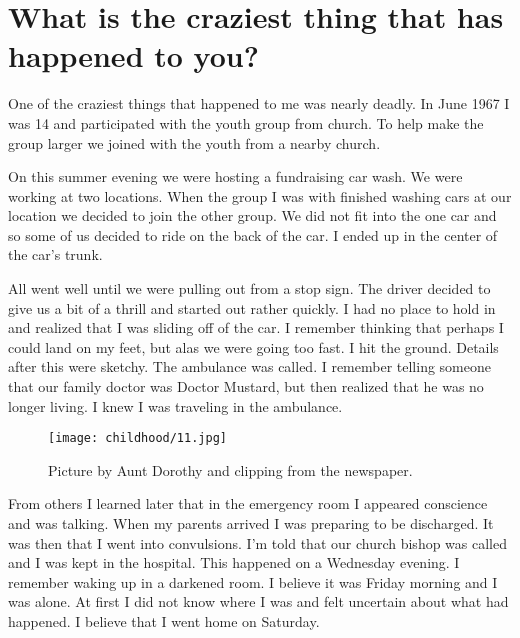 \section{What is the craziest thing that has happened to you?}
One of the craziest things that happened to me was nearly deadly.
In June 1967 I was 14 and participated with the youth group from church.
To help make the group larger we joined with the youth from a nearby church.

On this summer evening we were hosting a fundraising car wash.
We were working at two locations.
When the group I was with finished washing cars at our location we decided to join the other group.
We did not fit into the one car and so some of us decided to ride on the back of the car.
I ended up in the center of the car's trunk.

All went well until we were pulling out from a stop sign.
The driver decided to give us a bit of a thrill and started out rather quickly.
I had no place to hold in and realized that I was sliding off of the car.
I remember thinking that perhaps I could land on my feet, but alas we were going too fast.
I hit the ground.
Details after this were sketchy.
The ambulance was called.
I remember telling someone that our family doctor was Doctor Mustard, but then realized that he was no longer living.
I knew I was traveling in the ambulance.
\begin{figure}
\centering
\texttt{[image: childhood/11.jpg]}
\caption{
Picture by Aunt Dorothy and clipping from the newspaper.
}
\end{figure}

From others I learned later that in the emergency room I appeared conscience and was talking.
When my parents arrived I was preparing to be discharged.
It was then that I went into convulsions.
I'm told that our church bishop was called and I was kept in the hospital.
This happened on a Wednesday evening.
I remember waking up in a darkened room.
I believe it was Friday morning and I was alone.
At first I did not know where I was and felt uncertain about what had happened.
I believe that I went home on Saturday.
